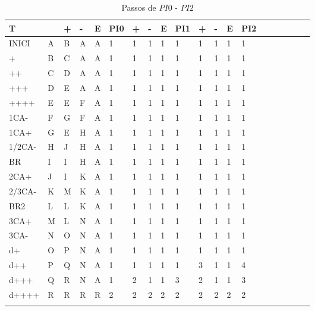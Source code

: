 \documentclass[12pt,a4paper]{report}
\begin{document}
\begin{table}[ht]
\caption{\label{tab:table-name} Passos de $PI0$ - $PI2$}
\centering
\begin{tabular}{ l l l l l l l l l l l l l l l l l l l l}
\hline
\hline
T      &   & + & - & E & PI0 & + & - & E & PI1 & + & - & E & PI2 &  &  &  &  &  &  \\ \hline
INICI  & A & B & A & A & 1   & 1 & 1 & 1 & 1   & 1 & 1 & 1 & 1   &  &  &  &  &  &  \\
+      & B & C & A & A & 1   & 1 & 1 & 1 & 1   & 1 & 1 & 1 & 1   &  &  &  &  &  &  \\
++     & C & D & A & A & 1   & 1 & 1 & 1 & 1   & 1 & 1 & 1 & 1   &  &  &  &  &  &  \\
+++    & D & E & A & A & 1   & 1 & 1 & 1 & 1   & 1 & 1 & 1 & 1   &  &  &  &  &  &  \\
++++   & E & E & F & A & 1   & 1 & 1 & 1 & 1   & 1 & 1 & 1 & 1   &  &  &  &  &  &  \\
1CA-   & F & G & F & A & 1   & 1 & 1 & 1 & 1   & 1 & 1 & 1 & 1   &  &  &  &  &  &  \\
1CA+   & G & E & H & A & 1   & 1 & 1 & 1 & 1   & 1 & 1 & 1 & 1   &  &  &  &  &  &  \\
1/2CA- & H & J & H & A & 1   & 1 & 1 & 1 & 1   & 1 & 1 & 1 & 1   &  &  &  &  &  &  \\
BR     & I & I & H & A & 1   & 1 & 1 & 1 & 1   & 1 & 1 & 1 & 1   &  &  &  &  &  &  \\
2CA+   & J & I & K & A & 1   & 1 & 1 & 1 & 1   & 1 & 1 & 1 & 1   &  &  &  &  &  &  \\
2/3CA- & K & M & K & A & 1   & 1 & 1 & 1 & 1   & 1 & 1 & 1 & 1   &  &  &  &  &  &  \\
BR2    & L & L & K & A & 1   & 1 & 1 & 1 & 1   & 1 & 1 & 1 & 1   &  &  &  &  &  &  \\
3CA+   & M & L & N & A & 1   & 1 & 1 & 1 & 1   & 1 & 1 & 1 & 1   &  &  &  &  &  &  \\
3CA-   & N & O & N & A & 1   & 1 & 1 & 1 & 1   & 1 & 1 & 1 & 1   &  &  &  &  &  &  \\
d+     & O & P & N & A & 1   & 1 & 1 & 1 & 1   & 1 & 1 & 1 & 1   &  &  &  &  &  &  \\
d++    & P & Q & N & A & 1   & 1 & 1 & 1 & 1   & 3 & 1 & 1 & 4   &  &  &  &  &  &  \\
d+++   & Q & R & N & A & 1   & 2 & 1 & 1 & 3   & 2 & 1 & 1 & 3   &  &  &  &  &  &  \\
d++++  & R & R & R & R & 2   & 2 & 2 & 2 & 2   & 2 & 2 & 2 & 2   &  &  &  &  &  &  \\
       &   &   &   &   &     &   &   &   &     &   &   &   &     &  &  &  &  &  &  \\ 
       \hline
\end{tabular}
\end{table}
\end{document}
